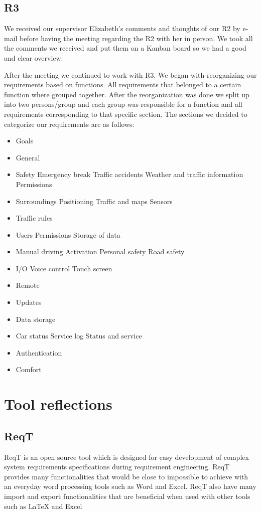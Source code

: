 \documentclass[10pt]{article}
\begin{document}
\subsection{R3}
We received our supervisor Elizabeth's comments and thoughts of our R2 by e-mail before having the meeting regarding the R2 with her in person. We took all the comments we received and put them on a Kanban board so we had a good and clear overview.

After the meeting we continued to work with R3. We began with reorganizing our requirements based on functions. All requirements that belonged to a certain function where grouped together. After the reorganization was done we split up into two persons/group and each group was responsible for a function and all requirements corresponding to that specific section. 
The sections we decided to categorize our requirements are as follows:
\begin{itemize}
\item Goals
\item General
\item Safety
\subitem Emergency break
\subitem Traffic accidents
\subitem Weather and traffic information
\subitem Permissions
\item Surroundings
\subitem Positioning
\subitem Traffic and maps
\subitem Sensors
\item Traffic rules
\item Users
\subitem Permissions
\subitem Storage of data
\item Manual driving
\subitem Activation
\subitem Personal safety
\subitem Road safety
\item I/O
\subitem Voice control
\subitem Touch screen
\item Remote
\item Updates
\item Data storage
\item Car status
\subitem Service log
\subitem Status and service
\item Authentication
\item Comfort
\end{itemize}



\section{Tool reflections}
\noindent
\subsection{ReqT}
ReqT is an open source tool which is designed for easy development of complex system requirements specifications during requirement engineering. ReqT provides many functionalities that would be close to impossible to achieve with an everyday word processing tools such as Word and Excel. ReqT also have many import and export functionalities that are beneficial when used with other tools such as LaTeX and Excel
\end{document}
